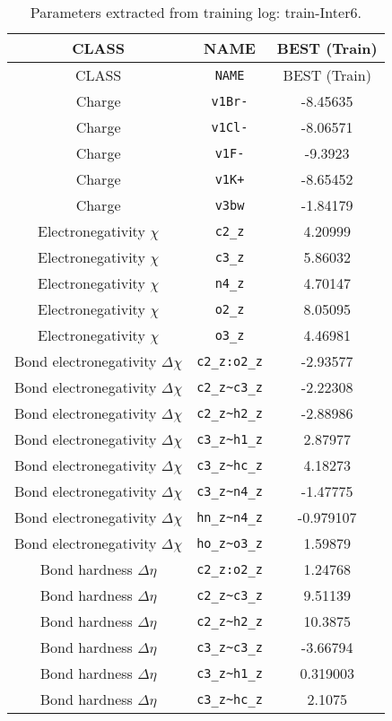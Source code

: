 \begin{table}[ht]
\caption{Parameters extracted from training log: train-Inter6.}
\begin{tabular}{|c|c|c|}
\hline
CLASS & NAME & BEST (Train) \\ 
\hline
CLASS & \verb^NAME^ & BEST (Train) \\ 
Charge & \verb^v1Br-^ & -8.45635 \\ 
Charge & \verb^v1Cl-^ & -8.06571 \\ 
Charge & \verb^v1F-^ & -9.3923 \\ 
Charge & \verb^v1K+^ & -8.65452 \\ 
Charge & \verb^v3bw^ & -1.84179 \\ 
Electronegativity $\chi$ & \verb^c2_z^ & 4.20999 \\ 
Electronegativity $\chi$ & \verb^c3_z^ & 5.86032 \\ 
Electronegativity $\chi$ & \verb^n4_z^ & 4.70147 \\ 
Electronegativity $\chi$ & \verb^o2_z^ & 8.05095 \\ 
Electronegativity $\chi$ & \verb^o3_z^ & 4.46981 \\ 
Bond electronegativity $\Delta\chi$ & \verb^c2_z:o2_z^ & -2.93577 \\ 
Bond electronegativity $\Delta\chi$ & \verb^c2_z~c3_z^ & -2.22308 \\ 
Bond electronegativity $\Delta\chi$ & \verb^c2_z~h2_z^ & -2.88986 \\ 
Bond electronegativity $\Delta\chi$ & \verb^c3_z~h1_z^ & 2.87977 \\ 
Bond electronegativity $\Delta\chi$ & \verb^c3_z~hc_z^ & 4.18273 \\ 
Bond electronegativity $\Delta\chi$ & \verb^c3_z~n4_z^ & -1.47775 \\ 
Bond electronegativity $\Delta\chi$ & \verb^hn_z~n4_z^ & -0.979107 \\ 
Bond electronegativity $\Delta\chi$ & \verb^ho_z~o3_z^ & 1.59879 \\ 
Bond hardness $\Delta\eta$ & \verb^c2_z:o2_z^ & 1.24768 \\ 
Bond hardness $\Delta\eta$ & \verb^c2_z~c3_z^ & 9.51139 \\ 
Bond hardness $\Delta\eta$ & \verb^c2_z~h2_z^ & 10.3875 \\ 
Bond hardness $\Delta\eta$ & \verb^c3_z~c3_z^ & -3.66794 \\ 
Bond hardness $\Delta\eta$ & \verb^c3_z~h1_z^ & 0.319003 \\ 
Bond hardness $\Delta\eta$ & \verb^c3_z~hc_z^ & 2.1075 \\ 

\end{tabular}
\end{table}
